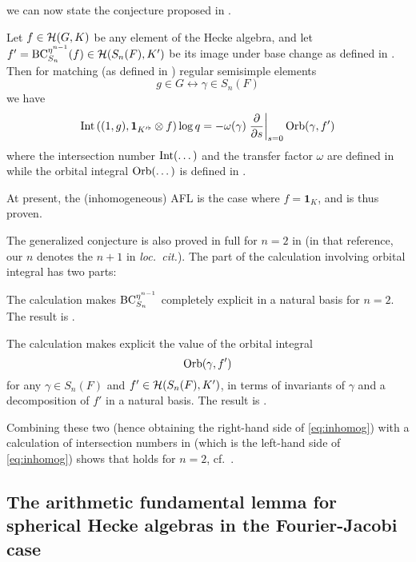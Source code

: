 we can now state the conjecture proposed in \cite{ref:AFLspherical}.
\begin{conjecture}
  \label{conj:inhomog}
  Let $f \in \mathcal H(G, K)$ be any element of the Hecke algebra,
  and let $f' = \operatorname{BC}_{S_n}^{\eta^{n-1}}(f) \in \mathcal H(S_n(F), K')$ be its image
  under base change as defined in .
  Then for matching (as defined in ) regular semisimple elements
  \[ g \in G \longleftrightarrow \gamma \in S_n(F) \]
  we have
  \begin{equation}
    \operatorname{Int}\left( (1,g), \mathbf{1}_{K'^\flat} \otimes f \right) \log q
    = -\omega(\gamma) \left. \pdv{}{s} \right\rvert_{s=0} \operatorname{Orb}(\gamma, f')
    \label{eq:inhomog}
  \end{equation}
  where the intersection number $\operatorname{Int}(\dots)$ and
  the transfer factor $\omega$ are defined in 
  while the orbital integral $\operatorname{Orb}(\dots)$ is defined in .
\end{conjecture}

At present, the (inhomogeneous) AFL is the case where $f = \mathbf{1}_K$,
and is thus proven.

The generalized conjecture is also proved in full for
$n = 2$ in \cite[Theorem 1.0.1]{ref:AFLspherical}
(in that reference, our $n$ denotes the $n+1$ in \emph{loc.\ cit.}).
The part of the calculation involving orbital integral has two parts:
\begin{itemize}
  \ii The calculation makes $\operatorname{BC}_{S_{n}}^{\eta^{n-1}}$
  completely explicit in a natural basis for $n = 2$.
  The result is \cite[Lemma 7.1.1]{ref:AFLspherical}.

  \ii The calculation makes explicit the value of the orbital integral
  \[ \operatorname{Orb}(\gamma, f') \]
  for any $\gamma \in S_n(F)$ and $f' \in \mathcal H(S_n(F), K')$,
  in terms of invariants of $\gamma$ and a decomposition of $f'$ in a natural basis.
  The result is \cite[Proposition 7.3.2]{ref:AFLspherical}.
\end{itemize}
Combining these two (hence obtaining the right-hand side of \eqref{eq:inhomog})
with a calculation of intersection numbers in \cite[Corollary 7.4.3]{ref:AFLspherical}
(which is the left-hand side of \eqref{eq:inhomog})
shows that  holds for $n = 2$,
cf.\ \cite[Theorem 7.5.1]{ref:AFLspherical}.

\subsection{The arithmetic fundamental lemma for spherical Hecke algebras
  in the Fourier-Jacobi case}

